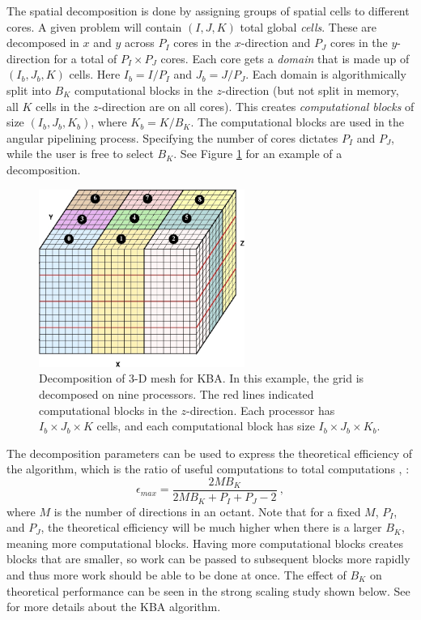 The spatial decomposition is done by assigning groups of spatial cells to different cores. A given problem will contain $(I, J, K)$ total global \emph{cells}. These are decomposed in $x$ and $y$ across $P_{I}$ cores in the $x$-direction and $P_{J}$ cores in the $y$-direction for a total of $P_{I} \times P_{J}$ cores. Each core gets a \emph{domain} that is made up of $(I_{b}, J_{b}, K)$ cells. Here $I_{b} = I/P_{I}$ and $J_{b} = J/P_{J}$. Each domain is algorithmically split into $B_{K}$ computational blocks in the $z$-direction (but not split in memory, all $K$ cells in the $z$-direction are on all cores). This creates \emph{computational blocks} of size $(I_{b}, J_{b}, K_{b})$, where $K_{b} = K/B_{K}$. The computational blocks are used in the angular pipelining process. Specifying the number of cores dictates $P_{I}$ and $P_{J}$, while the user is free to select $B_{K}$. See Figure \ref{fig:BlockDecomp} for an example of a decomposition.

\begin{figure}[!ht]	
  \begin{center}
    \includegraphics [width=0.6\textwidth, height=0.4\textheight ] {BlockDecompCropped}
  \end{center}
  \caption{Decomposition of 3-D mesh for KBA. In this example, the grid is decomposed on nine processors. The red lines indicated computational blocks in the $z$-direction. Each processor has $I_{b} \times J_{b} \times K$ cells, and each computational block has size $I_{b} \times J_{b} \times K_{b}$.}
  \label{fig:BlockDecomp}
\end{figure}

The decomposition parameters can be used to express the theoretical efficiency of the algorithm, which is the ratio of useful computations to total computations \cite{Evans2009d}, \cite{Baker1998}:
%
\begin{equation}
  \epsilon_{max} = \frac{2MB_{K}}{2MB_{K} + P_{I} + P_{J} - 2} \:, 
  \label{eq:efficiency}
\end{equation}
%
where $M$ is the number of directions in an octant. Note that for a fixed $M$, $P_{I}$, and $P_{J}$, the theoretical efficiency will be much higher when there is a larger $B_{K}$, meaning more computational blocks. Having more computational blocks creates blocks that are smaller, so work can be passed to subsequent blocks more rapidly and thus more work should be able to be done at once. The effect of $B_{K}$ on theoretical performance can be seen in the strong scaling study shown below. See \cite{Baker1998} for more details about the KBA algorithm.

